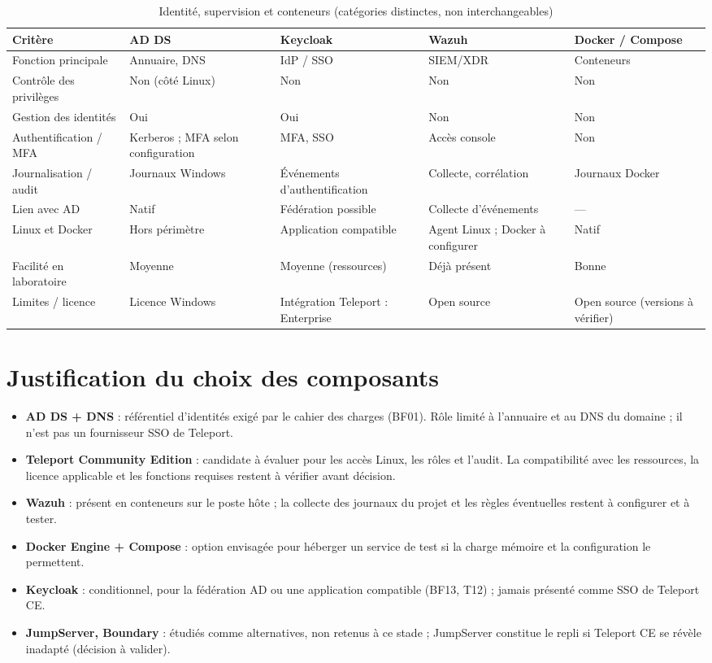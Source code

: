 \documentclass[11pt,a4paper]{report}
\begin{document}
\begin{longtable}{@{}p{}p{}p{}p{}p{}@{}}
\caption{Identité, supervision et conteneurs (catégories distinctes, non interchangeables)}\\
\toprule\textbf{Critère} & \textbf{AD DS} & \textbf{Keycloak} & \textbf{Wazuh} & \textbf{Docker / Compose}\\ \midrule\endhead
Fonction principale & Annuaire, DNS & IdP / SSO & SIEM/XDR & Conteneurs\\
Contrôle des privilèges & Non (côté Linux) & Non & Non & Non\\
Gestion des identités & Oui & Oui & Non & Non\\
Authentification / MFA & Kerberos ; MFA selon configuration & MFA, SSO & Accès console & Non\\
Journalisation / audit & Journaux Windows & Événements d'authentification & Collecte, corrélation & Journaux Docker\\
Lien avec AD & Natif & Fédération possible & Collecte d'événements & ---\\
Linux et Docker & Hors périmètre & Application compatible & Agent Linux ; Docker à configurer & Natif\\
Facilité en laboratoire & Moyenne & Moyenne (ressources) & Déjà présent & Bonne\\
Limites / licence & Licence Windows & Intégration Teleport : Enterprise & Open source & Open source (versions à vérifier)\\
\bottomrule
\end{longtable}
\normalsize
\normalsize

\section{Justification du choix des composants}\label{sec:justif}
\begin{itemize}
\item \textbf{AD DS + DNS} : référentiel d'identités exigé par le cahier des charges (BF01). Rôle limité à l'annuaire et au DNS du domaine ; il n'est pas un fournisseur SSO de Teleport.
\item \textbf{Teleport Community Edition} : candidate à évaluer pour les accès Linux, les rôles et l'audit. La compatibilité avec les ressources, la licence applicable et les fonctions requises restent à vérifier avant décision.
\item \textbf{Wazuh} : présent en conteneurs sur le poste hôte ; la collecte des journaux du projet et les règles éventuelles restent à configurer et à tester.
\item \textbf{Docker Engine + Compose} : option envisagée pour héberger un service de test si la charge mémoire et la configuration le permettent.
\item \textbf{Keycloak} : conditionnel, pour la fédération AD ou une application compatible (BF13, T12) ; jamais présenté comme SSO de Teleport CE.
\item \textbf{JumpServer, Boundary} : étudiés comme alternatives, non retenus à ce stade ; JumpServer constitue le repli si Teleport CE se révèle inadapté (décision à valider).
\end{itemize}
\end{document}
